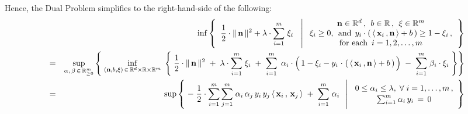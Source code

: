 Hence, the Dual Problem simplifies to the right-hand-side of the following:
\begin{eqnarray*}
&&
	\inf
	\left\{\;\;
		\dfrac{1}{2}\cdot\Vert\,\mathbf{n}\,\Vert^{2}
		+
		\lambda\cdot\overset{m}{\underset{i=1}{\sum}}\;\xi_{i}
		\;\;\,\left\vert\;
		\begin{array}{c}
			\mathbf{n} \in \Re^{d} \,,\;\, b \in \Re \,,\;\, \xi \in \Re^{m}
			\\
			\xi_{i} \geq 0,\;\,\textnormal{and}\;\,
			y_{i}\cdot\left(\,\langle\,\mathbf{x}_{i}\,,\mathbf{n}\,\rangle + b\,\right) \geq 1 - \xi_{i}\,,
			\\
			\textnormal{for each \,$i = 1,2,\ldots,m$}
			\end{array}
			\right.
		\right\}
\\
& = &
	\underset{\alpha,\,\beta\,\in\,\Re_{\geq 0}^{m}}{\sup}
	\left\{\;
		\underset{(\mathbf{n},b,\xi)\,\in\,\Re^{d}\times\Re\times\Re^{m}}{\inf}\;
		\left\{\;
			\dfrac{1}{2}\cdot\Vert\,\mathbf{n}\,\Vert^{2}
			\; + \;
			\lambda\cdot\overset{m}{\underset{i=1}{\sum}}\;\xi_{i}
			\; + \;
			\overset{m}{\underset{i = 1}{\sum}}\;\,
				\alpha_{i}
				\cdot
				\left(\,
					1 - \xi_{i}
					-
					y_{i}\overset{{\color{white}1}}{\cdot}\left(\,
						\langle\,\mathbf{x}_{i}\,,\mathbf{n}\,\rangle + b
						\,\right)
					\,\right)
			\; - \;
			\overset{m}{\underset{i = 1}{\sum}}\;
				\beta_{i}
				\cdot
				\xi_{i}
			\;\right\}
		\right\}
\\
& = &
	\sup
	\left\{\,
	\left.
		-\;\dfrac{1}{2}\cdot
		\overset{m}{\underset{i=1}{\sum}}\,
		\overset{m}{\underset{j=1}{\sum}}\;
		\alpha_{i}\,\alpha_{j}\,y_{i}\,y_{j}\,\langle\,\mathbf{x}_{i}\,,\,\mathbf{x}_{j}\,\rangle
		\; + \;
		\overset{m}{\underset{i = 1}{\sum}}\;\alpha_{i}
	\;\;\,\right\vert\,
		\begin{array}{c}
			0 \leq \alpha_{i} \leq \lambda,\;\forall\;i =1,\ldots,m\,,
			\\
			\sum_{i=1}^{m}\alpha_{i}\,y_{i} \,=\, \overset{{\color{white}.}}{0}
		\end{array}
		\right\}
\end{eqnarray*}


